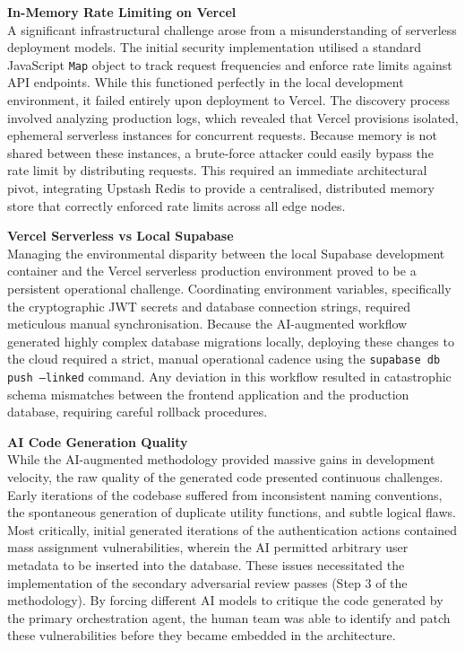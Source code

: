 \documentclass[12pt,a4paper]{report}
\begin{document}
\textbf{In-Memory Rate Limiting on Vercel}\\
A significant infrastructural challenge arose from a misunderstanding of serverless deployment models. The initial security implementation utilised a standard JavaScript \texttt{Map} object to track request frequencies and enforce rate limits against API endpoints. While this functioned perfectly in the local development environment, it failed entirely upon deployment to Vercel. The discovery process involved analyzing production logs, which revealed that Vercel provisions isolated, ephemeral serverless instances for concurrent requests. Because memory is not shared between these instances, a brute-force attacker could easily bypass the rate limit by distributing requests. This required an immediate architectural pivot, integrating Upstash Redis to provide a centralised, distributed memory store that correctly enforced rate limits across all edge nodes.

\textbf{Vercel Serverless vs Local Supabase}\\
Managing the environmental disparity between the local Supabase development container and the Vercel serverless production environment proved to be a persistent operational challenge. Coordinating environment variables, specifically the cryptographic JWT secrets and database connection strings, required meticulous manual synchronisation. Because the AI-augmented workflow generated highly complex database migrations locally, deploying these changes to the cloud required a strict, manual operational cadence using the \texttt{supabase db push --linked} command. Any deviation in this workflow resulted in catastrophic schema mismatches between the frontend application and the production database, requiring careful rollback procedures.

\textbf{AI Code Generation Quality}\\
While the AI-augmented methodology provided massive gains in development velocity, the raw quality of the generated code presented continuous challenges. Early iterations of the codebase suffered from inconsistent naming conventions, the spontaneous generation of duplicate utility functions, and subtle logical flaws. Most critically, initial generated iterations of the authentication actions contained mass assignment vulnerabilities, wherein the AI permitted arbitrary user metadata to be inserted into the database. These issues necessitated the implementation of the secondary adversarial review passes (Step 3 of the methodology). By forcing different AI models to critique the code generated by the primary orchestration agent, the human team was able to identify and patch these vulnerabilities before they became embedded in the architecture.
\end{document}

